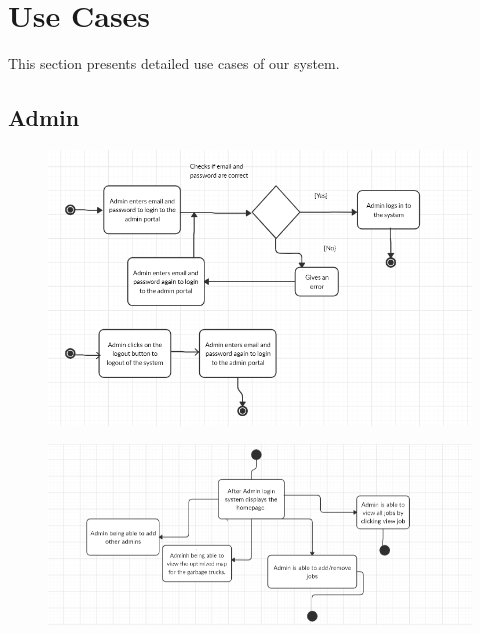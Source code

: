 \section{Use Cases}
This section presents detailed use cases of our system.
\subsection{Admin}
\begin{figure}[!hb]
   \centering

   \includegraphics[scale=0.6]{images/Admin_1.PNG}

 

\end{figure}

\begin{figure}[!hb]
   \centering

   \includegraphics[scale=0.6]{images/Admin_3.PNG}
\end{figure}
\newpage
